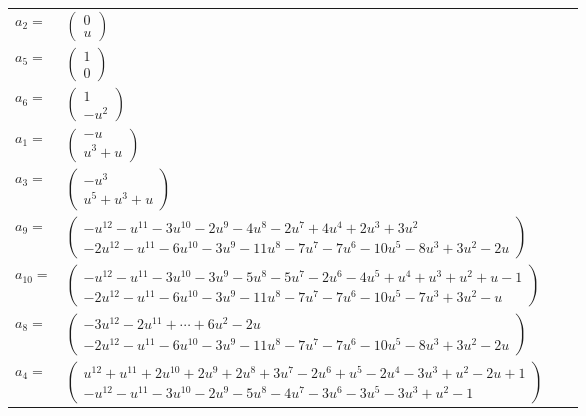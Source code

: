 \documentclass[1p]{elsarticle_modified}
\theoremstyle{definition}
\begin{document}
\begin{tabular}{m{7pt} m{180pt} m{7pt} m{180pt} }
\flushright $a_{2}=$&$\begin{pmatrix}0\\u\end{pmatrix}$ \\
\flushright $a_{5}=$&$\begin{pmatrix}1\\0\end{pmatrix}$ \\
\flushright $a_{6}=$&$\begin{pmatrix}1\\- u^2\end{pmatrix}$ \\
\flushright $a_{1}=$&$\begin{pmatrix}- u\\u^3+u\end{pmatrix}$ \\
\flushright $a_{3}=$&$\begin{pmatrix}- u^3\\u^5+u^3+u\end{pmatrix}$ \\
\flushright $a_{9}=$&$\begin{pmatrix}- u^{12}- u^{11}-3 u^{10}-2 u^9-4 u^8-2 u^7+4 u^4+2 u^3+3 u^2\\-2 u^{12}- u^{11}-6 u^{10}-3 u^9-11 u^8-7 u^7-7 u^6-10 u^5-8 u^3+3 u^2-2 u\end{pmatrix}$ \\
\flushright $a_{10}=$&$\begin{pmatrix}- u^{12}- u^{11}-3 u^{10}-3 u^9-5 u^8-5 u^7-2 u^6-4 u^5+u^4+u^3+u^2+u-1\\-2 u^{12}- u^{11}-6 u^{10}-3 u^9-11 u^8-7 u^7-7 u^6-10 u^5-7 u^3+3 u^2- u\end{pmatrix}$ \\
\flushright $a_{8}=$&$\begin{pmatrix}-3 u^{12}-2 u^{11}+\cdots+6 u^2-2 u\\-2 u^{12}- u^{11}-6 u^{10}-3 u^9-11 u^8-7 u^7-7 u^6-10 u^5-8 u^3+3 u^2-2 u\end{pmatrix}$ \\
\flushright $a_{4}=$&$\begin{pmatrix}u^{12}+u^{11}+2 u^{10}+2 u^9+2 u^8+3 u^7-2 u^6+u^5-2 u^4-3 u^3+u^2-2 u+1\\- u^{12}- u^{11}-3 u^{10}-2 u^9-5 u^8-4 u^7-3 u^6-3 u^5-3 u^3+u^2-1\end{pmatrix}$ \\

\end{tabular}
\end{document}
